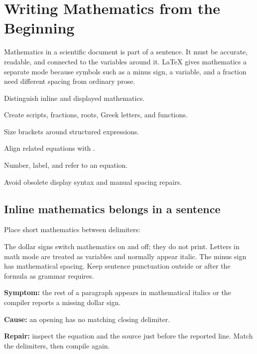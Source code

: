 \chapter{Writing Mathematics from the Beginning}
\label{chap:math-beginning}

Mathematics in a scientific document is part of a sentence. It must be
accurate, readable, and connected to the variables around it. \LaTeX{} gives
mathematics a separate mode because symbols such as a minus sign, a variable,
and a fraction need different spacing from ordinary prose.

\begin{learningoutcomes}
  \item Distinguish inline and displayed mathematics.
  \item Create scripts, fractions, roots, Greek letters, and functions.
  \item Size brackets around structured expressions.
  \item Align related equations with .
  \item Number, label, and refer to an equation.
  \item Avoid obsolete display syntax and manual spacing repairs.
\end{learningoutcomes}

\section{Inline mathematics belongs in a sentence}

Place short mathematics between \code{\$} delimiters:


The dollar signs switch mathematics on and off; they do not print. Letters in
math mode are treated as variables and normally appear italic. The minus sign
has mathematical spacing. Keep sentence punctuation outside or after the
formula as grammar requires.

\begin{commonerror}
\textbf{Symptom:} the rest of a paragraph appears in mathematical italics or
the compiler reports a missing dollar sign.

\textbf{Cause:} an opening \code{\$} has no matching closing delimiter.

\textbf{Repair:} inspect the equation and the source just before the reported
line. Match the delimiters, then compile again.
\end{commonerror}

